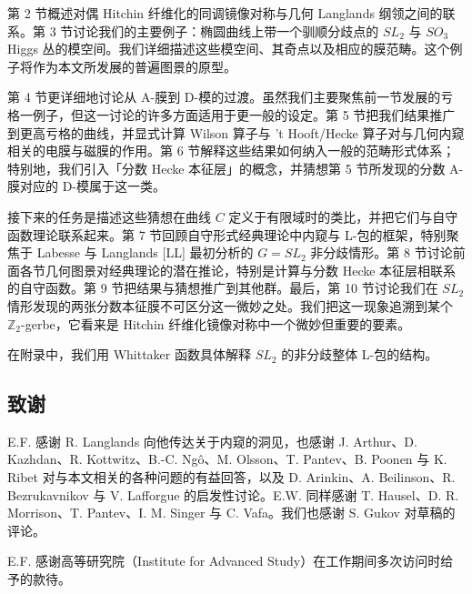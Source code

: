 第 2 节概述对偶 Hitchin 纤维化的同调镜像对称与几何 Langlands 纲领之间的联系。第 3 节讨论我们的主要例子：椭圆曲线上带一个驯顺分歧点的 $SL_2$ 与 $SO_3$ Higgs 丛的模空间。我们详细描述这些模空间、其奇点以及相应的膜范畴。这个例子将作为本文所发展的普遍图景的原型。

第 4 节更详细地讨论从 A-膜到 D-模的过渡。虽然我们主要聚焦前一节发展的亏格一例子，但这一讨论的许多方面适用于更一般的设定。第 5 节把我们结果推广到更高亏格的曲线，并显式计算 Wilson 算子与 't Hooft/Hecke 算子对与几何内窥相关的电膜与磁膜的作用。第 6 节解释这些结果如何纳入一般的范畴形式体系；特别地，我们引入「分数 Hecke 本征层」的概念，并猜想第 5 节所发现的分数 A-膜对应的 D-模属于这一类。

接下来的任务是描述这些猜想在曲线 $C$ 定义于有限域时的类比，并把它们与自守函数理论联系起来。第 7 节回顾自守形式经典理论中内窥与 L-包的框架，特别聚焦于 Labesse 与 Langlands [LL] 最初分析的 $G=SL_2$ 非分歧情形。第 8 节讨论前面各节几何图景对经典理论的潜在推论，特别是计算与分数 Hecke 本征层相联系的自守函数。第 9 节把结果与猜想推广到其他群。最后，第 10 节讨论我们在 $SL_2$ 情形发现的两张分数本征膜不可区分这一微妙之处。我们把这一现象追溯到某个 $\mathbb{Z}_2$-gerbe，它看来是 Hitchin 纤维化镜像对称中一个微妙但重要的要素。

在附录中，我们用 Whittaker 函数具体解释 $SL_2$ 的非分歧整体 L-包的结构。

\subsection{致谢}

E.F. 感谢 R. Langlands 向他传达关于内窥的洞见，也感谢 J. Arthur、D. Kazhdan、R. Kottwitz、B.-C. Ngô、M. Olsson、T. Pantev、B. Poonen 与 K. Ribet 对与本文相关的各种问题的有益回答，以及 D. Arinkin、A. Beilinson、R. Bezrukavnikov 与 V. Lafforgue 的启发性讨论。E.W. 同样感谢 T. Hausel、D. R. Morrison、T. Pantev、I. M. Singer 与 C. Vafa。我们也感谢 S. Gukov 对草稿的评论。

E.F. 感谢高等研究院（Institute for Advanced Study）在工作期间多次访问时给予的款待。

